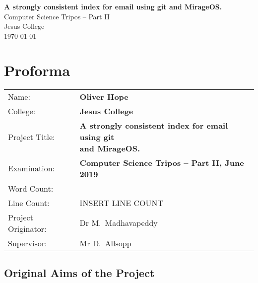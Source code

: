 \documentclass[12pt,a4paper,twoside,openright]{report}
\begin{document}





\pagestyle{empty}


\vspace*{60mm}
\begin{center}
\Huge
\textbf{A strongly consistent index for email using git and MirageOS.} \\[5mm]
Computer Science Tripos -- Part II \\[5mm]
Jesus College \\[5mm]
\today  %
\end{center}


\pagestyle{plain}

\chapter*{Proforma}

\begin{adjustbox}{width={\textwidth},totalheight={\textheight},keepaspectratio}%
{\large
\begin{tabular}{ll}
Name:               & \bf Oliver Hope \\
College:            & \bf Jesus College \\
Project Title:      & \makecell[l]{\bf A strongly consistent index for email using git \\ \bf and MirageOS.} \\
Examination:        & \bf Computer Science Tripos -- Part II, June 2019 \\
Word Count:         & \bf \footnotemark[1] \\
Line Count:         & INSERT LINE COUNT \\
Project Originator: & Dr M.~Madhavapeddy \\
Supervisor:         & Mr D.~Allsopp \\
\end{tabular}
}
\end{adjustbox}


\section*{Original Aims of the Project}
\end{document}
